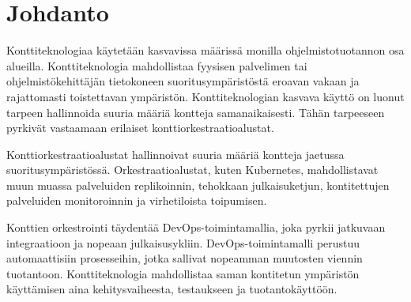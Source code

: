 \chapter{Johdanto\label{intro}}

Konttiteknologiaa käytetään kasvavissa määrissä monilla ohjelmistotuotannon osa alueilla. Konttiteknologia mahdollistaa fyysisen palvelimen tai ohjelmistökehittäjän tietokoneen suoritusympäristöstä eroavan vakaan ja rajattomasti toistettavan ympäristön. Konttiteknologian kasvava käyttö on luonut tarpeen hallinnoida suuria määriä kontteja samanaikaisesti. Tähän tarpeeseen pyrkivät vastaamaan erilaiset konttiorkestraatioalustat. \cite{Watada19}

Konttiorkestraatioalustat hallinnoivat suuria määriä kontteja jaetussa suoritusympäristössä. Orkestraatioalustat, kuten Kubernetes, mahdollistavat muun muassa palveluiden replikoinnin, tehokkaan julkaisuketjun, kontitettujen palveluiden monitoroinnin ja virhetiloista toipumisen. \cite{Khan17}

Konttien orkestrointi täydentää DevOps-toimintamallia, joka pyrkii jatkuvaan integraatioon ja nopeaan julkaisusykliin. DevOps-toimintamalli perustuu automaattisiin prosesseihin, jotka sallivat nopeamman muutosten viennin tuotantoon. Konttiteknologia mahdollistaa saman kontitetun ympäristön käyttämisen aina kehitysvaiheesta, testaukseen ja tuotantokäyttöön. \cite{Jabbari16}
